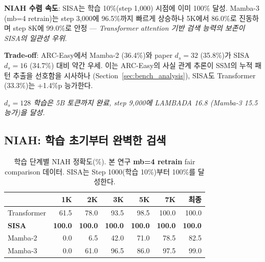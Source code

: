 \documentclass[11pt]{article}
\begin{document}
\textbf{NIAH 수렴 속도}: SISA는 학습 10\%(step 1,000) 시점에 이미 100\% 달성. Mamba-3 (mb=4 retrain)는 step 3,000에 96.5\%까지 빠르게 상승하나 5K에서 86.0\%로 진동하며 step 8K에 99.0\%로 안정 — \textit{Transformer attention 기반 검색 능력의 보존이 SISA의 일관성 우위}.

\textbf{Trade-off}: ARC-Easy에서 Mamba-2 (36.4\%)와 paper $d_s = 32$ (35.8\%)가 SISA $d_s=16$ (34.7\%) 대비 약간 우세. 이는 ARC-Easy의 사실 관계 추론이 SSM의 누적 패턴 추출을 선호함을 시사하나 (Section~\ref{sec:bench_analysis}), SISA도 Transformer (33.3\%)는 +1.4\%p 능가한다.

\textit{$d_s = 128$ 학습은 5B 토큰까지 완료, step 9,000에 LAMBADA 16.8 (Mamba-3 15.5 능가)을 달성.}

\subsection{NIAH: 학습 초기부터 완벽한 검색}

\begin{table}[h]
\centering
\caption{학습 단계별 NIAH 정확도(\%). 본 연구 \textbf{mb=4 retrain} fair comparison 데이터. SISA는 Step 1000(학습 10\%)부터 100\%를 달성한다.}
\label{tab:niah}
\begin{tabular}{lrrrrrr}
\toprule
& \textbf{1K} & \textbf{2K} & \textbf{3K} & \textbf{5K} & \textbf{7K} & \textbf{최종} \\
\midrule
Transformer & 61.5 & 78.0 & 93.5 & 98.5 & 100.0 & 100.0 \\
\textbf{SISA} & \textbf{100.0} & \textbf{100.0} & \textbf{100.0} & \textbf{100.0} & \textbf{100.0} & \textbf{100.0} \\
Mamba-2 & 0.0 & 6.5 & 42.0 & 71.0 & 78.5 & 82.5 \\
Mamba-3 & 0.0 & 61.0 & 96.5 & 86.0 & 97.5 & 99.0 \\
\bottomrule
\end{tabular}
\end{table}
\end{document}
